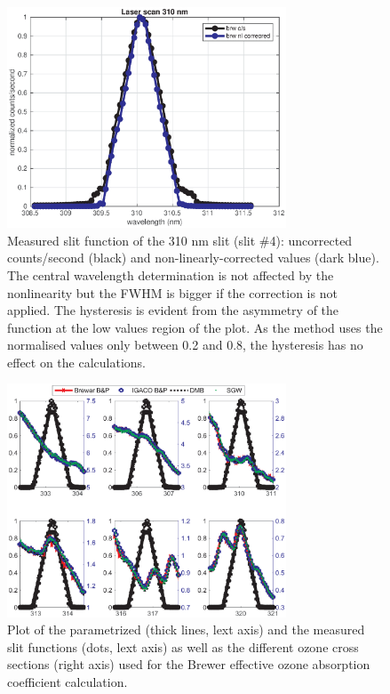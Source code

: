 \documentclass[acp, manuscript]{copernicus}
\begin{document}
\begin{figure}[t]
\includegraphics[width=8.3cm]{figures/General_Corrected_vs_uncorrected.eps}
\caption{Measured slit function of the 310 nm slit (slit \#4): uncorrected counts/second (black) and non-linearly-corrected values (dark blue). The central wavelength determination is not affected by the nonlinearity but the FWHM is bigger if the correction is not applied. The hysteresis is evident from the asymmetry of the function at the low values region of the plot. As the method uses the normalised values only between 0.2 and 0.8, the hysteresis has no effect on the calculations.}
\label{fig:slitcor}
\end{figure}

%


%
\begin{figure}[t]
\includegraphics[width=8.3cm]{figures/General_Laser_Brewer_ozone_mode.eps}
\caption{ Plot of the parametrized (thick lines, lext axis) and the measured slit functions (dots, lext axis) as well as the different ozone cross sections (right axis) used for the Brewer effective ozone absorption coefficient calculation.}
\label{fig:param}
\end{figure}
\end{document}
